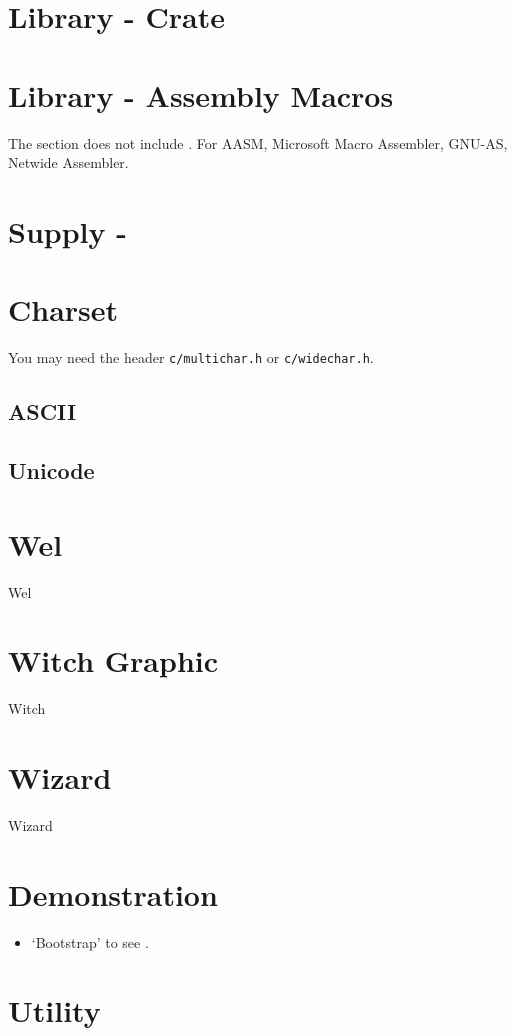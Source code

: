 \section{Library \mbox{-}  Crate}

\section{Library \mbox{-} Assembly Macros}

The section does not include . For AASM, Microsoft Macro Assembler, GNU-AS, Netwide Assembler.

\section{Supply \mbox{-} }

\section{Charset}

You may need the header \verb|c/multichar.h| or \verb|c/widechar.h|.

\subsection{ASCII}

\subsection{Unicode}





\section{Wel}
{Wel}

\section{Witch Graphic}
{Witch}

\section{Wizard}
{Wizard}

\section{Demonstration}

\begin{itemize}
	\item `Bootstrap' to see .
\end{itemize}

\section{Utility}




